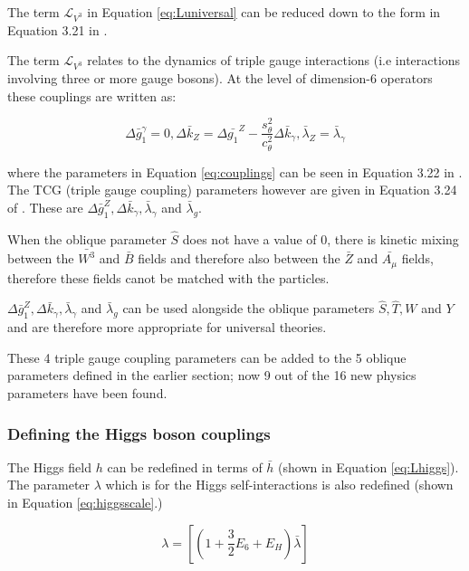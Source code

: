 \documentclass[11pt,oneside,a4paper]{article}
\begin{document}
The term $\mathcal{L}_{V^3}$ in Equation \ref{eq:Luniversal} can be reduced down to the form in Equation 3.21 in \cite{universal}. 


The term $\mathcal{L}_{V^3}$ relates to the dynamics of triple gauge interactions (i.e interactions involving three or more gauge bosons). At the level of dimension-6 operators these couplings are written as:

\begin{equation}
\label{eq:couplings}
\Delta\bar{g}_1^{\gamma} = 0, \Delta\bar{k}_{Z} = \Delta\bar{g_{1}}^{Z} - \frac{s_{\theta}^{2}}{c_{\theta}^{2}}\Delta\bar{k}_\gamma, \bar{\lambda}_{Z} = \bar{\lambda}_{\gamma}
\end{equation}

where the parameters in Equation \ref{eq:couplings} can be seen in Equation 3.22 in \cite{universal}. The TCG (triple gauge coupling) parameters however are given in Equation 3.24 of \cite{universal}. These are $\Delta\bar{g}_1^{Z}, \Delta\bar{k}_{\gamma}, \bar{\lambda}_{\gamma}$ and $\bar{\lambda}_{g}$. 


When the oblique parameter $\hat{S}$  does not have a value of 0, there is kinetic mixing
between the $\bar{W^{3}}$ and $\bar{B}$ fields and therefore also between the $\bar{Z}$ and $\bar{A_{\mu}}$ fields, therefore these fields canot be matched with the particles. 
	
 $\Delta\bar{g}_1^{Z}, \Delta\bar{k}_{\gamma}, \bar{\lambda}_{\gamma}$ and $\bar{\lambda}_{g}$ can be used alongside the oblique parameters $\hat{S}, \hat{T}, W$ and $Y$ and are therefore more appropriate for universal theories.

These 4 triple gauge coupling parameters can be added to the 5 oblique parameters defined in the earlier section; now 9 out of the 16 new physics parameters have been found.
\subsubsection{Defining the Higgs boson couplings}

The Higgs field $h$ can be redefined in terms of $\bar{h}$  (shown in Equation \ref{eq:Lhiggs}). The parameter $\lambda$ which is for the Higgs self-interactions is also redefined (shown in Equation \ref{eq:higgsscale}.)

\begin{equation}
\label{eq:higgsscale}
\lambda = [(1+\frac{3}{2}E_{6}+E_{H})\bar{\lambda}]
\end{equation}
\end{document}
